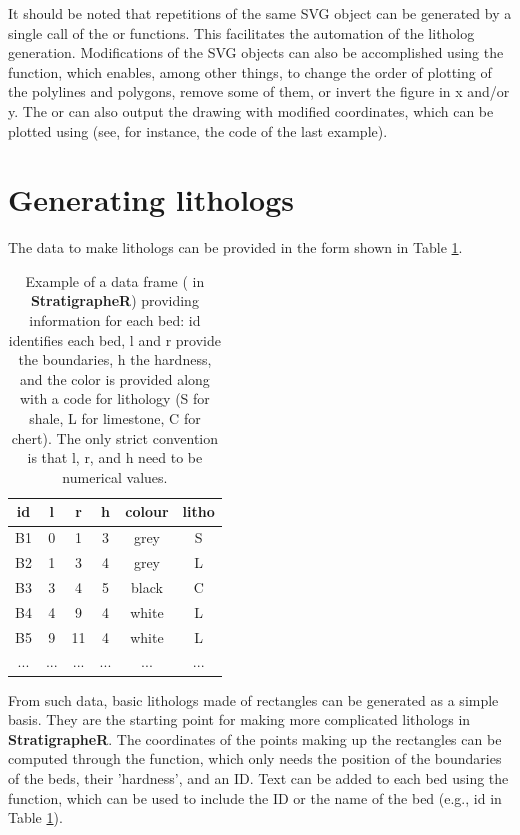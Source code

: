It should be noted that repetitions of the same SVG object can be generated by a single call of the  or  functions. This facilitates the automation of the litholog generation. Modifications of the SVG objects can also be accomplished using the  function, which enables, among other things, to change the order of plotting of the polylines and polygons, remove some of them, or invert the figure in x and/or y. The  or  can also output the drawing with modified coordinates, which can be plotted using  (see, for instance, the code of the last example).

\section{Generating lithologs}

The data to make lithologs can be provided in the form shown in Table \ref{Tab:beds}.

\begin{table}[H]
\centering
\begin{tabular}{*{6}{c}}
	\toprule
	id & l & r & h & colour & litho \\
	\midrule
	B1 & 0 & 1 & 3 & grey &	S \\
	B2 & 1 & 3 & 4 & grey &	L \\
	B3 & 3 & 4 & 5 & black & C \\
	B4 & 4 & 9 & 4 & white & L \\
	B5 & 9 & 11 & 4 & white & L \\
	...&...&...&...&...&... \\
	\bottomrule
\end{tabular}
\caption{Example of a data frame ( in \textbf{StratigrapheR}) providing information for each bed: id identifies each bed, l and r provide the boundaries, h the hardness, and the color is provided along with a code for lithology (S for shale, L for limestone, C for chert). The only strict convention is that l, r, and h need to be numerical values.}
\label{Tab:beds}
\end{table}

From such data, basic lithologs made of rectangles can be generated as a simple basis. They are the starting point for making more complicated lithologs in \textbf{StratigrapheR}. The coordinates of the points making up the rectangles can be computed through the  function, which only needs the position of the boundaries of the beds, their 'hardness', and an ID. Text can be added to each bed using the  function, which can be used to include the ID or the name of the bed (e.g., id in Table \ref{Tab:beds}).

